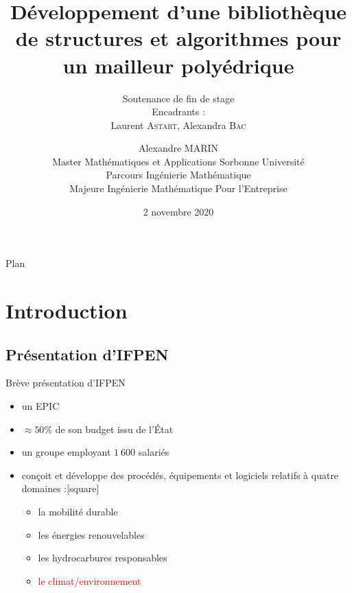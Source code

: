 \documentclass[aspectratio=169, 12pt, a4paper, hyperref={pdfauthor={Alexandre MARIN}, pdfkeywords={IFPEN, Delaunay, Voronoi, mesh generation}, colorlinks=true, linkcolor=purple, urlcolor=blue, citecolor=magenta}]{beamer}
\begin{document}
\begin{frame}
\date{2 novembre 2020}
\author{\small Alexandre \textsc{MARIN}\\ { Master Mathématiques et Applications Sorbonne Université\\ Parcours Ingénierie Mathématique\\ Majeure Ingénierie Mathématique Pour l'Entreprise}}
\title{Développement d’une bibliothèque de structures et algorithmes pour un mailleur polyédrique}
\subtitle{\small Soutenance de fin de stage\\ Encadrants :\\ Laurent \textsc{Astart}, Alexandra \textsc{Bac}}
\maketitle
\end{frame}

\begin{Energie}{Plan}
\tableofcontents
\end{Energie}

\section{Introduction}

\subsection{Présentation d'IFPEN}
\begin{Energie}{Brève présentation d'IFPEN}
\begin{itemize}
\item un EPIC
\item $\approx 50$\% de son budget issu de l'\'Etat
\item un groupe employant $1\ 600$ salariés
\item conçoit et développe des procédés, équipements et logiciels relatifs à quatre domaines :[square]
\begin{itemize}
\item la mobilité durable
\item les énergies renouvelables
\item les hydrocarbures responsables
\item \textcolor{red}{le climat/environnement}
\end{itemize}
\end{itemize}
\end{Energie}
\end{document}
